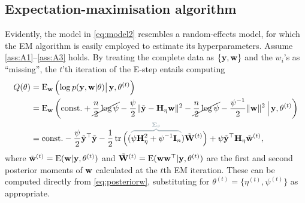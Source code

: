 \subsection{Expectation-maximisation algorithm}
\label{sec:emiprior}

Evidently, the model in \cref{eq:model2} resembles a random-effects model, for which the EM algorithm is easily employed to estimate its hyperparameters.
Assume \ref{ass:A1}--\ref{ass:A3} holds.
By treating the complete data as $\{{\mathbf y},{\mathbf w} \}$ and the $w_i$'s as ``missing'', the $t$'th iteration of the E-step entails computing
\begin{align}
  Q(\theta) 
  &= \E_\bw \left( \log p(\by, \bw | \theta) \big\vert\, \by,\theta^{(t)} \right) \nonumber \\
  &= \E_\bw \left( \const 
  + \cancel{\half[n]\log\psi}
  - \half[\psi] \Vert \tilde\by - \bH_\eta\bw \Vert^2  
  - \cancel{\half[n]\log\psi}
  - \half[\psi^{-1}] \Vert \bw \Vert^2
  \,\Big\vert\, \by,\theta^{(t)} \right) \label{eq:QfnEstep} \\
  &=  \const - \half[\psi] \tilde \by^\top \tilde \by
  - \half \tr \Big( (
  \myoverbrace{\psi\bH_\eta^2 + \psi^{-1}\bI_n}{\bSigma_\theta} 
  )\tilde\bW^{(t)} \Big)
  + \psi\tilde\by^\top\bH_\eta\wtilde^{(t)}, \nonumber
\end{align}
where $\tilde{{\mathbf w}}^{(t)} = \operatorname{E}({\mathbf w}|{\mathbf y},\theta^{(t)})$ and $\tilde{{\mathbf W}}^{(t)} = \operatorname{E}({\mathbf w}{\mathbf w}^\top|{\mathbf y},\theta^{(t)})$ are the first and second posterior moments of ${\mathbf w}$ calculated at the $t$th EM iteration.
These can be computed directly from \cref{eq:posteriorw}, substituting for $\theta^{(t)} = \{\eta^{(t)}, \psi^{(t)} \}$ as appropriate.

